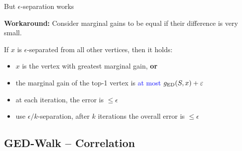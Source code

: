 \documentclass[10pt,titlepage,english,presentation]{beamer}
\newcommand{\emphcolor}{blue}
\renewcommand{\emph}[1]{\textcolor{\emphcolor}{#1}}
\begin{document}
\begin{frame}{But $\epsilon$-separation works~\parencite{DBLP:conf/esa/GrintenBGBM18}}
\medskip

\textbf{Workaround:} Consider marginal gains to be equal if their difference is very small.

\begingroup\centering
{}
\par\endgroup

If $x$ is $\epsilon$-separated from all other vertices, then it holds:
\begin{itemize}
    \small
    \item $x$ is the vertex with greatest marginal gain, \textbf{or}
    \item the marginal gain of the top-1 vertex is \emph{at most $g_{\text{ED}}(S, x) + \varepsilon$}
    \item at each iteration, the error is $\le\epsilon$
    \item[\faHandORight] use $\epsilon / k$-separation, after $k$ iterations the
        overall error is $\le \epsilon$
\end{itemize}
\bigskip
\end{frame}


\subsection{GED-Walk -- Correlation}
\end{document}
